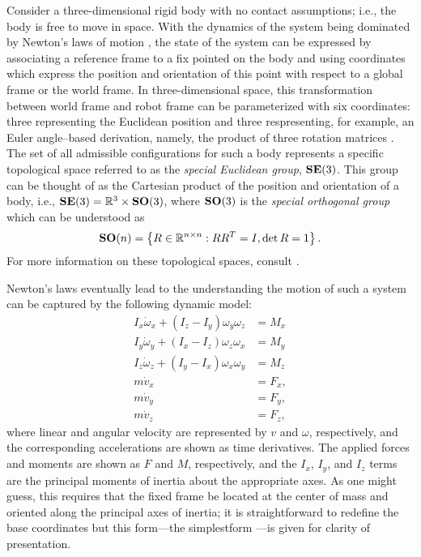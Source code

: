Consider a three-dimensional rigid body with no contact assumptions; i.e., the body is free to move in space.
%
With the dynamics of the system being dominated by Newton's laws of motion \cite{Feynman1964}, the state of the system can be expressed by associating a reference frame to a fix pointed on the body and using coordinates which express the position and orientation of this point with respect to a global frame or the world frame.
%
In three-dimensional space, this transformation between world frame and robot frame can be parameterized with six coordinates: three representing the Euclidean position and three respresenting, for example, an Euler angle--based derivation, namely, the product of three rotation matrices \cite{Baruh1998}.
%
The set of all admissible configurations for such a body represents a specific topological space referred to as the {\em special Euclidean group}, $\mathbf{SE}(3)$.
%
This group can be thought of as the Cartesian product of the position and orientation of a body, i.e., $\mathbf{SE}(3) = \mathbb{R}^3 \times \mathbf{SO}(3)$, where $\mathbf{SO}(3)$ is the {\em special orthogonal group} which can be understood as
\begin{align*}
  \mathbf{SO}(n) = \left\{ R \in \mathbb{R}^{n \times n} : R R^T = I, \det R = 1 \right\}.
\end{align*}
For more information on these topological spaces, consult \cite{Murray1994}.


Newton's laws eventually lead to the understanding the motion of such a system can be captured by the following dynamic model:
\begin{align}
  \nonumber
  I_{x} \dot{\omega}_{x} + (I_{z} - I_{y}) \omega_{y} \omega_{z} &= M_{x}\\
  \nonumber
  I_{y} \dot{\omega}_{y} + (I_{x} - I_{z}) \omega_{z} \omega_{x} &= M_{y}\\
  \nonumber
  I_{z} \dot{\omega}_{z} + (I_{y} - I_{x}) \omega_{x} \omega_{y} &= M_{z}\\
  \nonumber
  m \dot{v}_{x} &= F_{x},\\
  \nonumber
  m \dot{v}_{y} &= F_{y},\\
  m \dot{v}_{z} &= F_{z},
\end{align}
where linear and angular velocity are represented by $v$ and $\omega$, respectively, and the corresponding accelerations are shown as time derivatives.
%
The applied forces and moments are shown as $F$ and $M$, respectively, and the $I_{x}$, $I_{y}$, and $I_{z}$ terms are the principal moments of inertia about the appropriate axes.
%
As one might guess, this requires that the fixed frame be located at the center of mass and oriented along the principal axes of inertia; it is straightforward to redefine the base coordinates but this form---the simplestform ---is given for clarity of presentation.

